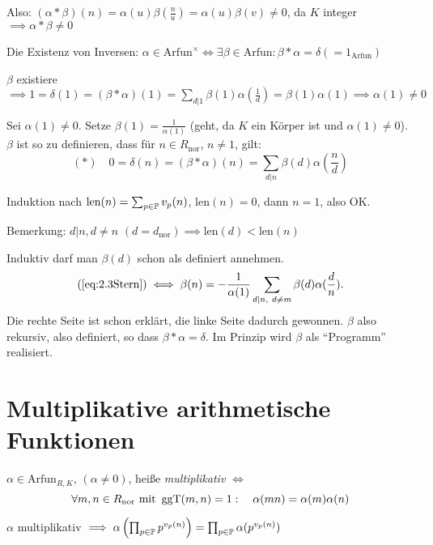 \documentclass[a4paper,twoside,DIV15,BCOR12mm]{scrbook}
\begin{document}
\begin{beweis}
Also: $(\alpha * \beta)(n) = \alpha(u) \beta(\frac nu) = \alpha(u)
\beta(v) \ne 0$, da $K$ integer $\implies \alpha * \beta \ne 0 $

Die Existenz von Inversen: $\alpha \in \text{Arfun}^\times \iff
\exists \beta \in \text{Arfun}: \beta * \alpha = \delta
(=1_\text{Arfun})$

$\beta$ existiere $\implies 1 = \delta(1) = (\beta * \alpha)(1) =
\sum_{d|1} \beta(1) \alpha(\frac 1 d) = \beta(1) \alpha(1) \implies
\alpha(1) \ne 0$

Sei $\alpha(1) \ne 0$. Setze $\beta(1) = \frac 1 {\alpha(1)}$ (geht,
da $K$ ein Körper ist und $\alpha(1) \ne 0$). $\beta$ ist so zu
definieren, dass für $n\in R_\text{nor}$, $n\ne1$, gilt:
\begin{equation}\label{eq:2.3Stern}
    (*) \quad 0 = \delta(n) = (\beta * \alpha)(n) = \sum_{d|n}
\beta(d) \alpha(\frac nd)
\end{equation}

Induktion nach $\text{len}(n) = \sum_{p\in\mathbb{P}} v_p(n)$,
$\text{len}(n) = 0$, dann $n=1$, also OK.

Bemerkung: $d|n, d\ne n$ $(d=d_\text{nor}) \implies \text{len}(d) <
\text{len}(n)$

Induktiv darf man $\beta(d)$ schon als definiert annehmen.
$$(\ref{eq:2.3Stern}) \iff \beta(n) = -\frac 1 {\alpha(1)}
\sum_{d|n,\ d\ne m} \beta(d)\alpha(\frac d n).$$ Die rechte Seite
ist schon erklärt, die linke Seite dadurch gewonnen. $\beta$ also
rekursiv, also definiert, so dass $\beta * \alpha = \delta$. Im
Prinzip wird $\beta$ als "`Programm"' realisiert.

\end{beweis}
\section{Multiplikative arithmetische Funktionen}

\begin{definition}
$\alpha \in \text{Arfun}_{R,K}$, $(\alpha\ne 0)$, heiße
\emph{multiplikativ} $\iff$
\[ \forall m,n \in R_\text{nor}\text{ mit }\mathop{\rm ggT}\nolimits(m,n)=1 :\quad  \alpha(mn) = \alpha(m) \alpha(n) \]
\end{definition}
$\alpha$ multiplikativ $\implies \alpha\left(\prod_{p\in\mathbb{P}}
p^{v_p(n)}\right) = \prod_{p\in\mathbb{P}} \alpha(p^{v_p(n)})$
\end{document}
